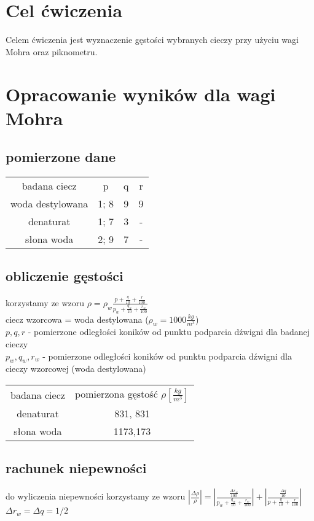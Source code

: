 \documentclass{article}
\begin{document}
\section{Cel ćwiczenia}
Celem ćwiczenia jest wyznaczenie gęstości wybranych cieczy  przy użyciu wagi Mohra oraz piknometru.

\section{Opracowanie wyników dla wagi Mohra}
\subsection{pomierzone dane}
\begin{center}
\begin{tabular}{ c | c | c | c }
badana ciecz & p & q & r \\
 woda destylowana & 1; 8 & 9  &  9  \\ 
 denaturat  & 1; 7 & 3 & - \\  
 słona woda & 2; 9 & 7 & -    
\end{tabular}
\end{center}

\subsection{obliczenie gęstości}
korzystamy ze wzoru 
$\rho = \rho_w \frac{p+\frac{q}{10} + \frac{r}{100}}{p_w+\frac{q_w}{10} + \frac{r_w}{100}} $
\\ ciecz wzorcowa = woda destylowana ($\rho_w = 1000 \frac{kg}{m^3}$)
\\ $p, q, r$ - pomierzone odległości koników od punktu podparcia dźwigni dla badanej cieczy \\
$p_w, q_w,  r_w$ - pomierzone odległości koników od punktu podparcia dźwigni dla cieczy wzorcowej (woda destylowana)

\begin{center}
\begin{tabular}{ c | c }
badana ciecz & pomierzona gęstość $\rho [\frac{kg}{m^3}]$\\
 denaturat  & 831, 831\\  
 słona woda & 1173,173
\end{tabular}
\end{center}

\subsection{rachunek niepewności}
do wyliczenia niepewności korzystamy ze wzoru $|\frac{\Delta \rho}{\rho}| = |\frac{\frac{\Delta r_w}{100}}{p_w+\frac{q_w}{10} + \frac{r_w}{100}}| + |\frac{\frac{\Delta q}{10}}{p+\frac{q}{10} + \frac{r}{100}}|$ \\
$\Delta r_w = \Delta q = 1/2$
\end{document}
